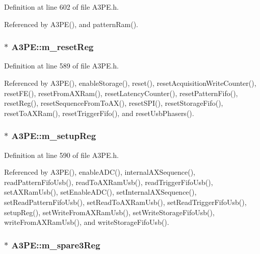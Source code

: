 Definition at line 602 of file A3PE.h.

Referenced by A3PE(), and patternRam().\hypertarget{classA3PE_ab4db5f00976e5095686f108c8febf702}{
\subsubsection[{m\_\-resetReg}]{$\ast$ {\bf A3PE::m\_\-resetReg}}}
\label{classA3PE_ab4db5f00976e5095686f108c8febf702}


Definition at line 589 of file A3PE.h.

Referenced by A3PE(), enableStorage(), reset(), resetAcquisitionWriteCounter(), resetFE(), resetFromAXRam(), resetLatencyCounter(), resetPatternFifo(), resetReg(), resetSequenceFromToAX(), resetSPI(), resetStorageFifo(), resetToAXRam(), resetTriggerFifo(), and resetUsbPhasers().\hypertarget{classA3PE_a142fa10b7e705c4701ae21678ec2ec8a}{
\subsubsection[{m\_\-setupReg}]{$\ast$ {\bf A3PE::m\_\-setupReg}}}
\label{classA3PE_a142fa10b7e705c4701ae21678ec2ec8a}


Definition at line 590 of file A3PE.h.

Referenced by A3PE(), enableADC(), internalAXSequence(), readPatternFifoUsb(), readToAXRamUsb(), readTriggerFifoUsb(), setAXRamUsb(), setEnableADC(), setInternalAXSequence(), setReadPatternFifoUsb(), setReadToAXRamUsb(), setReadTriggerFifoUsb(), setupReg(), setWriteFromAXRamUsb(), setWriteStorageFifoUsb(), writeFromAXRamUsb(), and writeStorageFifoUsb().\hypertarget{classA3PE_a1e7e5c89f190672990ae5bece2a8b1aa}{
\subsubsection[{m\_\-spare3Reg}]{$\ast$ {\bf A3PE::m\_\-spare3Reg}}}
\label{classA3PE_a1e7e5c89f190672990ae5bece2a8b1aa}


